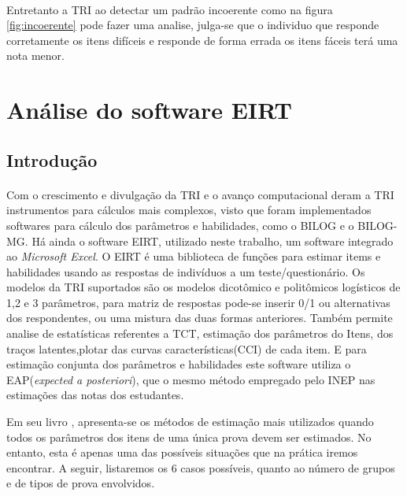 	\paragraph{}
	    Entretanto a TRI ao detectar um padrão incoerente como na figura  \ref{fig:incoerente} pode fazer uma analise, julga-se que o individuo que responde corretamente os itens difíceis e responde de forma errada os itens fáceis terá uma nota menor.
	\section{Análise do software EIRT}
	\subsection{Introdução}
	\paragraph{}
    	Com o  crescimento e divulgação da TRI e o avanço computacional deram a TRI instrumentos para cálculos mais complexos, visto que foram implementados softwares para cálculo dos parâmetros e habilidades, como o BILOG e o BILOG-MG. Há ainda o software EIRT, utilizado neste trabalho, um software integrado ao \textit{Microsoft Excel}. O EIRT é uma biblioteca de funções para estimar items e habilidades usando as respostas de indivíduos a um teste/questionário. Os modelos da TRI suportados são os modelos dicotômico e politômicos logísticos de 1,2 e 3 parâmetros, para matriz de respostas pode-se inserir 0/1 ou alternativas dos respondentes, ou uma mistura das duas formas anteriores. Também permite analise de estatísticas referentes a TCT, estimação dos parâmetros do Itens,  dos traços latentes,plotar das curvas características(CCI) de cada item. E para estimação conjunta dos parâmetros e habilidades este software utiliza o EAP(\textit{expected a posteriori}), que o mesmo método empregado pelo INEP nas estimações das notas dos estudantes.
	\par
    	Em seu livro \textcite{Dalton}, apresenta-se os métodos de estimação mais utilizados quando todos os parâmetros dos itens de uma única prova devem ser estimados. No entanto, esta é apenas uma das possíveis situações que na prática iremos encontrar. A seguir, listaremos os 6 casos possíveis, quanto ao número de grupos e de tipos de prova envolvidos.
